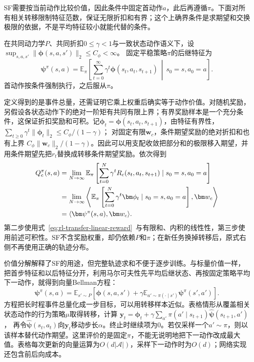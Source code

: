 SF需要按当前动作比较价值，因此条件中固定首动作$a$，此后再遵循$\pi$。下面对所有相关转移限制特征范数，保证无限折扣和有界；这个上确界条件是求期望和交换极限的依据，不是平均特征较小就能代替的条件。

\begin{definition}[固定策略的后继特征]
 \label{def:rl-transfer-sf}
 在共同动力学$P$、共同折扣$0\leq\gamma<1$与一致状态动作语义下，设
 $\sup_{s,a,s'}\lVert\bm\phi(s,a,s')\rVert_2\leq C_\phi<\infty$。
 固定平稳策略$\pi$的后继特征为
 \begin{equation}
 \bm\psi^\pi(s,a)=
 \mathbb E_\pi\!\left[
 \sum_{t=0}^{\infty}\gamma^t\bm\phi(s_t,a_t,s_{t+1})
 \,\middle|\,s_0=s,a_0=a\right].
 \label{eq:rl-transfer-sf}
 \end{equation}
 首动作按条件强制执行，之后服从$\pi$。
\end{definition}

定义得到的是事件总量，还需证明它乘上权重后确实等于动作价值。对随机奖励，另假设各状态动作下的绝对一阶矩有共同有限上界；有界奖励样本是一个充分条件，这保证折扣奖励和可积。记$\bm\phi_t=\bm\phi(s_t,a_t,s_{t+1})$，由特征有界性，
$\sum_{t\geq0}\gamma^t\lVert\bm\phi_t\rVert_2\leq C_\phi/(1-\gamma)$；
对固定有限$\bm w_c$，条件期望奖励的绝对折扣和也有上界
$C_\phi\lVert\bm w_c\rVert_2/(1-\gamma)$。因此可以用支配收敛把部分和的极限移入期望，并用条件期望先把$r_t$替换成转移条件期望奖励。依次得到
\begin{align}
 Q_c^\pi(s,a)
 &=\lim_{N\to\infty}\mathbb E_\pi
       \left[\sum_{t=0}^{N}\gamma^t R_c(s_t,a_t,s_{t+1})
       \mid s_0=s,a_0=a\right]\notag\\
 &=\lim_{N\to\infty}\left\langle
       \mathbb E_\pi\left[\sum_{t=0}^{N}\gamma^t\bm\phi_t
       \mid s_0=s,a_0=a\right],\bm w_c\right\rangle\notag\\
 &=\langle\bm\psi^\pi(s,a),\bm w_c\rangle.
 \label{eq:rl-transfer-sf-value}
\end{align}
第二步使用式~\eqref{eq:rl-transfer-linear-reward}~与有限和、内积的线性性，第三步使用前述可积性。SF不含奖励权重，却仍依赖$P$和$\pi$；在新任务换掉转移后，原式右侧不再使用正确的轨迹分布。

价值分解解释了SF的用途，但完整轨迹求和不便于逐步训练。与标量价值一样，把首步特征和以后特征分开，利用马尔可夫性先平均后继状态、再按固定策略平均下一动作，就得到向量Bellman方程：
\begin{equation}
 \bm\psi^\pi(s,a)=
 \mathbb E_{s'\sim P}\left[\bm\phi(s,a,s')
 +\gamma\mathbb E_{a'\sim\pi(\cdot\mid s')}\bm\psi^\pi(s',a')\right].
 \label{eq:rl-transfer-sf-bellman}
\end{equation}
方程把长时程事件总量化成一步目标，可以用转移样本近似。表格情形从覆盖相关状态动作的行为策略$\mu$取得转移，计算
$\bm y_t=\bm\phi_t+\gamma\sum_{a'}\pi(a'\mid s_{t+1})\widehat{\bm\psi}(s_{t+1},a')$，
再令$\widehat{\bm\psi}(s_t,a_t)$向$\bm y_t$移动步长$\alpha$。终止时继续项为0。若仅采样一个$a'\sim\pi$，则以该样本替代动作期望。这里评价的是固定$\pi$，不能无说明地把下一动作改成最大值。表格每次更新的向量运算为$O(d|\mathcal A|)$，采样下一动作时为$O(d)$；网络实现还包含前后向成本。

